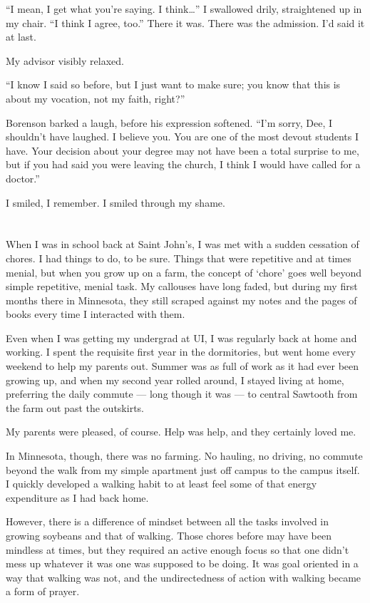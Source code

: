 ``I mean, I get what you're saying. I think\ldots{}'' I swallowed drily, straightened up in my chair. ``I think I agree, too.'' There it was. There was the admission. I'd said it at last.

My advisor visibly relaxed.

``I know I said so before, but I just want to make sure; you know that this is about my vocation, not my faith, right?''

Borenson barked a laugh, before his expression softened. ``I'm sorry, Dee, I shouldn't have laughed. I believe you. You are one of the most devout students I have. Your decision about your degree may not have been a total surprise to me, but if you had said you were leaving the church, I think I would have called for a doctor.''

I smiled, I remember. I smiled through my shame.

\section{}

When I was in school back at Saint John's, I was met with a sudden cessation of chores. I had things to do, to be sure. Things that were repetitive and at times menial, but when you grow up on a farm, the concept of `chore' goes well beyond simple repetitive, menial task. My callouses have long faded, but during my first months there in Minnesota, they still scraped against my notes and the pages of books every time I interacted with them.

Even when I was getting my undergrad at UI, I was regularly back at home and working. I spent the requisite first year in the dormitories, but went home every weekend to help my parents out. Summer was as full of work as it had ever been growing up, and when my second year rolled around, I stayed living at home, preferring the daily commute --- long though it was --- to central Sawtooth from the farm out past the outskirts.

My parents were pleased, of course. Help was help, and they certainly loved me.

In Minnesota, though, there was no farming. No hauling, no driving, no commute beyond the walk from my simple apartment just off campus to the campus itself. I quickly developed a walking habit to at least feel some of that energy expenditure as I had back home.

However, there is a difference of mindset between all the tasks involved in growing soybeans and that of walking. Those chores before may have been mindless at times, but they required an active enough focus so that one didn't mess up whatever it was one was supposed to be doing. It was goal oriented in a way that walking was not, and the undirectedness of action with walking became a form of prayer.

